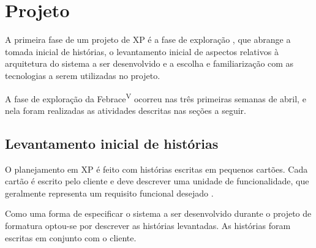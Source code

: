 \section{Projeto}

  A primeira fase de um projeto de XP é a fase de exploração \cite{beck04}, que abrange a tomada inicial de histórias, o levantamento inicial de aspectos relativos à arquitetura do sistema a ser desenvolvido e a escolha e familiarização com as tecnologias a serem utilizadas no projeto.

  A fase de exploração da Febrace\textsuperscript{V} ocorreu nas três primeiras semanas de abril, e nela foram realizadas as atividades descritas nas seções a seguir.

  \subsection{Levantamento inicial de histórias}

    O planejamento em XP é feito com histórias escritas em pequenos cartões. Cada cartão é escrito pelo cliente e deve descrever uma unidade de funcionalidade, que geralmente representa um requisito funcional desejado \cite{sato07}.

    Como uma forma de especificar o sistema a ser desenvolvido durante o projeto de formatura optou-se por descrever as histórias levantadas. As histórias foram escritas em conjunto com o cliente.

